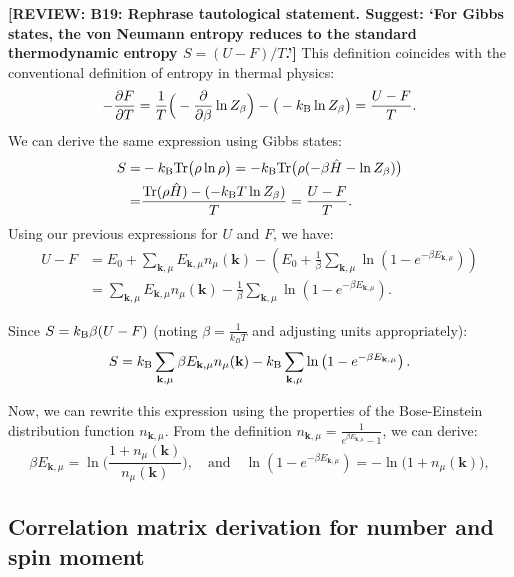\documentclass[aps, prx, nofootinbib, superscriptaddress]{revtex4-2}
\newcommand{\REVIEW}[1]{{\color{reviewcolor}\bfseries [REVIEW: #1]}}
\newcommand{\kvec}{\mathbf{k}}
\newcommand{\Tr}{\mathrm{Tr}}
\begin{document}
\REVIEW{B19: Rephrase tautological statement. Suggest: `For Gibbs states, the von Neumann entropy reduces to the standard thermodynamic entropy $S=(U-F)/T$.'}
This definition coincides with the conventional definition of entropy in thermal physics:
\begin{align}
    - \frac{\partial F}{\partial T}
    = \frac{1}{T} \Big(-\frac{\partial}{\partial \beta} \ln Z_{\beta} \Big) - \big(-k_{\rm B} \ln Z_{\beta} \big)
    = \frac{U - F}{T}.
\end{align}
We can derive the same expression using Gibbs states:
\begin{align}
    S = & -k_{\rm B}\Tr \big( \rho \ln \rho \big)
    = -k_{\rm B}\Tr \big( \rho (-\beta \hat{H} - \ln Z_{\beta}) \big) \nonumber \\
    = &  \frac{ \Tr (\rho \hat{H}) - (-k_{\rm B}T\ln Z_{\beta})}{T} 
    = \frac{U - F}{T}.
\end{align}
Using our previous expressions for $U$ and $F$, we have:
\begin{align}
    U - F &= E_0 + \sum_{\kvec, \mu} E_{\kvec, \mu} n_{\mu}(\kvec) - \left( E_0 + \frac{1}{\beta} \sum_{\kvec, \mu} \ln \left( 1 - e^{-\beta E_{\kvec, \mu}} \right) \right) \nonumber \\ 
    &= \sum_{\kvec, \mu} E_{\kvec, \mu} n_{\mu}(\kvec) - \frac{1}{\beta} \sum_{\kvec, \mu} \ln \left( 1 - e^{-\beta E_{\kvec, \mu}} \right).
\end{align}

Since $S = k_{\rm B} \beta (U - F)$ (noting $\beta = \frac{1}{k_B T}$ and adjusting units appropriately):
\begin{equation}
    S = k_{\rm B} \sum_{\kvec, \mu} \beta E_{\kvec, \mu} n_{\mu} (\kvec) - k_{\rm B} \sum_{\kvec, \mu} \ln \left( 1 - e^{-\beta E_{\kvec, \mu}} \right).
\end{equation}

Now, we can rewrite this expression using the properties of the Bose-Einstein distribution function $n_{\kvec, \mu}$. From the definition $n_{\kvec, \mu} = \frac{1}{e^{\beta E_{\kvec, \mu}} - 1}$, we can derive:
\begin{equation}
    \beta E_{\kvec, \mu} = \ln \Big( \frac{1 + n_{\mu}(\kvec)}{n_{\mu}(\kvec)} \Big), 
    \quad \text{and} \quad
    \ln \left( 1 - e^{-\beta E_{\kvec, \mu}} \right) 
    = -\ln \big( 1 + n_{\mu} (\kvec) \big), 
\end{equation}

\subsection*{Correlation matrix derivation for number and spin moment}
\end{document}
